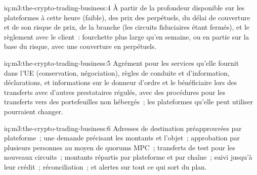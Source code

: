 \begin{solution}{iq:m3:the-crypto-trading-business:4}
À partir de la profondeur disponible sur les plateformes à cette heure (faible), des prix des perpétuels, du délai de couverture et de son risque de prix, de la branche  (les circuits fiduciaires étant fermés), et
le règlement avec le client~: fourchette plus large qu'en semaine, ou en partie sur la base du risque, avec une couverture en perpétuels.
\end{solution}

\begin{solution}{iq:m3:the-crypto-trading-business:5}
Agrément pour les services qu'elle fournit dans l'UE (conservation, négociation), règles de conduite et d'information, déclarations, et informations sur le donneur d'ordre et le bénéficiaire
lors des transferts avec d'autres prestataires régulés, avec des procédures pour les transferts vers des portefeuilles non hébergés~; les plateformes qu'elle peut utiliser pourraient changer.
\end{solution}

\begin{solution}{iq:m3:the-crypto-trading-business:6}
Adresses de destination préapprouvées par plateforme~; une demande précisant les montants et l'objet~; approbation par plusieurs personnes au moyen de quorums MPC~; transferts de test pour les nouveaux circuits~;
montants répartis par plateforme et par chaîne~; suivi jusqu'à leur crédit~; réconciliation~; et alertes sur tout ce qui sort du plan.
\end{solution}
